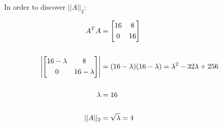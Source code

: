 		In order to discover $||A||_{2}$:

		\begin{align}
			A^{T}A &= \begin{bmatrix}
					16 & 8 \\[0.3em]
					0 & 16
				\end{bmatrix}& \\
				\notag \\
			\left| \begin{bmatrix}
					16-\lambda & 8 \\[0.3em]
					0 & 16-\lambda
				\end{bmatrix} \right| &=  (16-\lambda)(16-\lambda) = \lambda^{2} - 32\lambda + 256& \\
				\notag \\
				\lambda &= 16& \\
				\notag \\
				||A||_{2} &= \sqrt{\lambda} = 4&
		\label{eq:65beigen}
		\end{align}